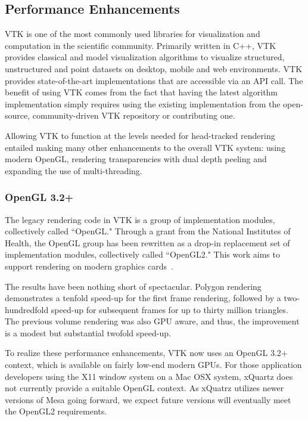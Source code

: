 \subsection{Performance Enhancements}

VTK is one of the most commonly used libraries for visualization and computation in the scientific community.
Primarily written in C++, VTK provides classical and model visualization algorithms to visualize structured, unstructured and point datasets on desktop, mobile and web environments.
VTK provides state-of-the-art implementations that are accessible via an API call.
The benefit of using VTK comes from the fact that having the latest algorithm implementation simply requires using the existing implementation from the
open-source, community-driven VTK repository or contributing one.

Allowing VTK to function at the levels needed for head-tracked rendering entailed making
many other enhancements to the overall VTK system:
using modern OpenGL,
rendering transparencies with dual depth peeling and
expanding the use of multi-threading.

\subsubsection{OpenGL 3.2+}

The legacy rendering code in VTK is a group of implementation modules, collectively called ``OpenGL."
Through a grant from the National Institutes of Health, the OpenGL group has
been rewritten as a drop-in replacement set of implementation modules,
collectively called ``OpenGL2."
This work aims to support rendering on modern graphics cards~\cite{Hanwell:2015}.

The results have been nothing short of spectacular.
Polygon rendering demonstrates a tenfold speed-up for the first frame rendering, followed by a two-hundredfold speed-up for subsequent frames for up to thirty million triangles.
The previous volume rendering was also GPU aware, and thus, the improvement is a modest but substantial twofold speed-up. 

To realize these performance enhancements, VTK now uses an OpenGL 3.2+ context, which is available on fairly low-end modern GPUs.
For those application developers using the X11 window system on a Mac OSX system, xQuartz does not currently provide a suitable OpenGL context.
As xQuatrz utilizes newer versions of Mesa going forward, we expect future versions will eventually meet the OpenGL2 requirements.

